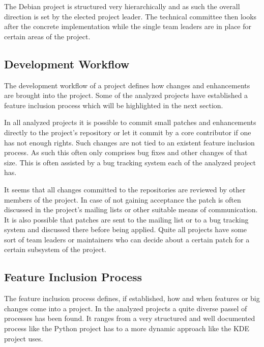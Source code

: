 The Debian project is structured very hierarchically and as such the overall
direction is set by the elected project leader. The technical committee then
looks after the concrete implementation while the single team leaders are in
place for certain areas of the project.


\subsection{Development Workflow} %
\label{sub:Development Workflow}

The development workflow of a project defines how changes and enhancements are
brought into the project. Some of the analyzed projects have established a
feature inclusion process which will be highlighted in the next section.

In all analyzed projects it is possible to commit small patches and
enhancements directly to the project's repository or let it commit by a core
contributor if one has not enough rights. Such changes are not tied to an
existent feature inclusion process. As such this often only comprises bug fixes
and other changes of that size. This is often assisted by a bug tracking system
each of the analyzed project has.

It seems that all changes committed to the repositories are reviewed by other
members of the project. In case of not gaining acceptance the patch is often
discussed in the project's mailing lists or other suitable means of
communication. It is also possible that patches are sent to the mailing list or
to a bug tracking system and discussed there before being applied. Quite all
projects have some sort of team leaders or maintainers who can decide about a
certain patch for a certain subsystem of the project.


\subsection{Feature Inclusion Process} %
\label{sub:Feature Inclusion Process}

The feature inclusion process defines, if established, how and when features or
big changes come into a project. In the analyzed projects a quite diverse
passel of processes has been found. It ranges from a very structured and well
documented process like the Python project has to a more dynamic approach like
the KDE project uses.

